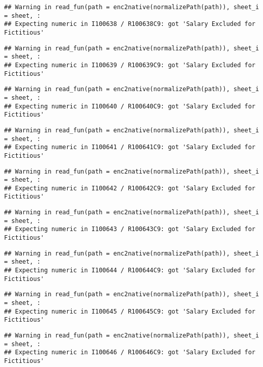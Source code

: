 \documentclass[
]{article}
\begin{document}
\begin{verbatim}
## Warning in read_fun(path = enc2native(normalizePath(path)), sheet_i = sheet, :
## Expecting numeric in I100638 / R100638C9: got 'Salary Excluded for Fictitious'
\end{verbatim}

\begin{verbatim}
## Warning in read_fun(path = enc2native(normalizePath(path)), sheet_i = sheet, :
## Expecting numeric in I100639 / R100639C9: got 'Salary Excluded for Fictitious'
\end{verbatim}

\begin{verbatim}
## Warning in read_fun(path = enc2native(normalizePath(path)), sheet_i = sheet, :
## Expecting numeric in I100640 / R100640C9: got 'Salary Excluded for Fictitious'
\end{verbatim}

\begin{verbatim}
## Warning in read_fun(path = enc2native(normalizePath(path)), sheet_i = sheet, :
## Expecting numeric in I100641 / R100641C9: got 'Salary Excluded for Fictitious'
\end{verbatim}

\begin{verbatim}
## Warning in read_fun(path = enc2native(normalizePath(path)), sheet_i = sheet, :
## Expecting numeric in I100642 / R100642C9: got 'Salary Excluded for Fictitious'
\end{verbatim}

\begin{verbatim}
## Warning in read_fun(path = enc2native(normalizePath(path)), sheet_i = sheet, :
## Expecting numeric in I100643 / R100643C9: got 'Salary Excluded for Fictitious'
\end{verbatim}

\begin{verbatim}
## Warning in read_fun(path = enc2native(normalizePath(path)), sheet_i = sheet, :
## Expecting numeric in I100644 / R100644C9: got 'Salary Excluded for Fictitious'
\end{verbatim}

\begin{verbatim}
## Warning in read_fun(path = enc2native(normalizePath(path)), sheet_i = sheet, :
## Expecting numeric in I100645 / R100645C9: got 'Salary Excluded for Fictitious'
\end{verbatim}

\begin{verbatim}
## Warning in read_fun(path = enc2native(normalizePath(path)), sheet_i = sheet, :
## Expecting numeric in I100646 / R100646C9: got 'Salary Excluded for Fictitious'
\end{verbatim}
\end{document}
